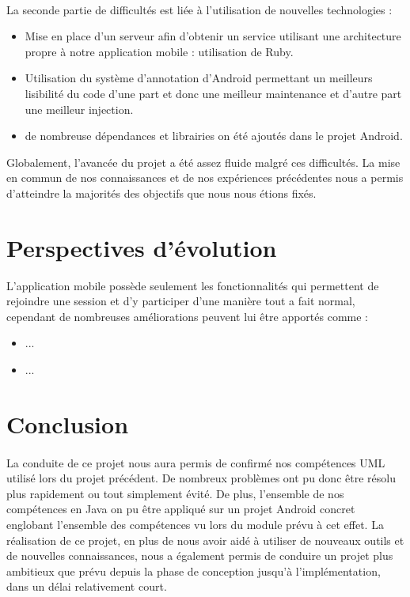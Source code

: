 \documentclass[titlepage, 12pt]{report}
\begin{document}
\paragraph{}La seconde partie de difficultés est liée à l'utilisation de nouvelles technologies :
\begin{itemize}
	\item Mise en place d'un serveur afin d'obtenir un service utilisant une architecture propre à notre application mobile : utilisation de Ruby.
	\item Utilisation du système d'annotation d'Android permettant un meilleurs lisibilité du code d'une part et donc une meilleur maintenance et d'autre part une meilleur injection.
	\item de nombreuse dépendances et librairies on été ajoutés dans le projet Android. 
\end{itemize}

Globalement, l'avancée du projet a été assez fluide malgré ces difficultés. La mise en commun de nos connaissances et de nos expériences précédentes nous a permis d'atteindre la majorités des objectifs que nous nous étions fixés.

\section{Perspectives d'évolution}

L'application mobile possède seulement les fonctionnalités qui permettent de rejoindre une session et d'y participer d'une manière tout a fait normal, cependant de nombreuses améliorations peuvent lui être apportés comme :
\begin{itemize}
	\item ...
	\item ...
\end{itemize}

\section{Conclusion}

\paragraph{}La conduite de ce projet nous aura permis de confirmé nos compétences UML utilisé lors du projet précédent. De nombreux problèmes ont pu donc être résolu plus rapidement ou tout simplement évité.
De plus, l'ensemble de nos compétences en Java on pu être appliqué sur un projet Android concret englobant l'ensemble des compétences vu lors du module prévu à cet effet.
La réalisation de ce projet, en plus de nous avoir aidé à utiliser de nouveaux outils et de nouvelles connaissances, nous a également permis de conduire un projet plus ambitieux que prévu depuis la phase de conception jusqu'à l'implémentation, dans un délai relativement court. 
\end{document}
